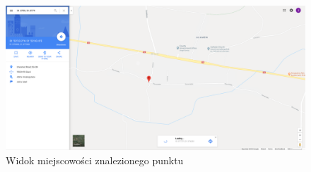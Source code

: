 \documentclass[]{article}
\begin{document}
\begin{figure}
	\centering
	\includegraphics[width=0.99\linewidth]{blisko}
	\caption{Widok miejscowości znalezionego punktu}
	\label{fig:blisko}
\end{figure}
\end{document}
